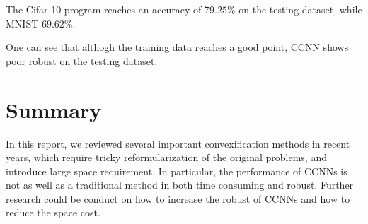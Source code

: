 \documentclass{article}
\begin{document}
The Cifar-10 program reaches an accuracy of $79.25\%$ on the testing dataset, while MNIST $69.62\%$. 

One can see that althogh the training data reaches a good point, CCNN shows poor robust on the testing dataset.
\section{Summary}
In this report, we reviewed several important convexification methods in recent years, which require tricky reformularization of the original problems, and introduce large space requirement. In particular, the performance of CCNNs is not as well as a traditional method in both time consuming and robust. Further research could be conduct on how to increase the robust of CCNNs and how to reduce the space cost.


\end{document}
